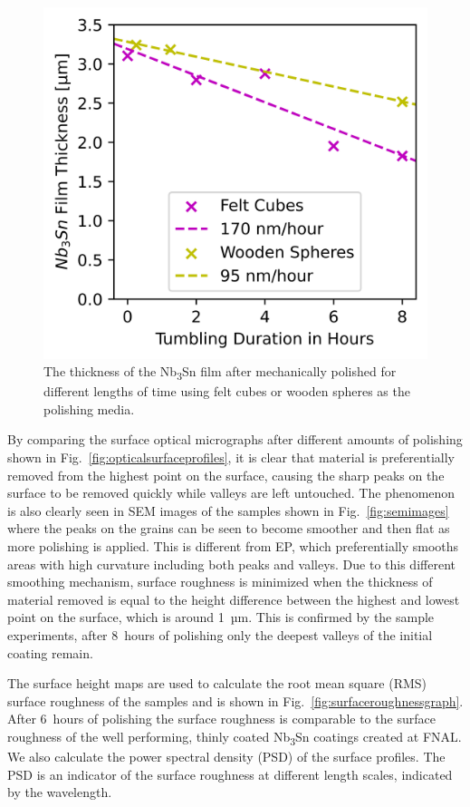 \documentclass[reprint,amsmath,amssymb,aps]{revtex4-2}%
\begin{document}
%


\begin{figure}[t]%
\centering%
\includegraphics[width=0.8\columnwidth]{../doc/figs/Material_Removal_Graph.png}%
\caption{The thickness of the Nb\textsubscript{3}Sn film after mechanically polished for different lengths of time using felt cubes or wooden spheres as the polishing media.}%
\label{fig:materialremovalgraph}%
\end{figure}

By comparing the surface optical micrographs after different amounts of polishing shown in Fig.~\ref{fig:opticalsurfaceprofiles}, it is clear that material is preferentially removed from the highest point on the surface, causing the sharp peaks on the surface to be removed quickly while valleys are left untouched. The phenomenon is also clearly seen in SEM images of the samples shown in Fig.~\ref{fig:semimages} where the peaks on the grains can be seen to become smoother and then flat as more polishing is applied. This is different from EP, which preferentially smooths areas with high curvature including both peaks and valleys. Due to this different smoothing mechanism, surface roughness is minimized when the thickness of material removed is equal to the height difference between the highest and lowest point on the surface, which is around 1~µm. This is confirmed by the sample experiments, after 8~hours of polishing only the deepest valleys of the initial coating remain.

The surface height maps are used to calculate the root mean square (RMS) surface roughness of the samples and is shown in Fig.~\ref{fig:surfaceroughnessgraph}. After 6~hours of polishing the surface roughness is comparable to the surface roughness of the well performing, thinly coated Nb\textsubscript{3}Sn coatings created at FNAL\cite{posen2021advances}. We also calculate the power spectral density (PSD) of the surface profiles. The PSD is an indicator of the surface roughness at different length scales, indicated by the wavelength\cite{xu2011enhanced, pudasaini2017surface}.
\end{document}
